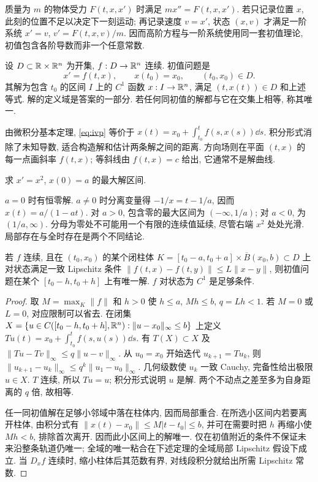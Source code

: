 质量为 $m$ 的物体受力 $F(t,x,x')$ 时满足 $mx''=F(t,x,x')$. 若只记录位置 $x$, 此刻的位置不足以决定下一刻运动; 再记录速度 $v=x'$, 状态 $(x,v)$ 才满足一阶系统 $x'=v$, $v'=F(t,x,v)/m$. 因而高阶方程与一阶系统使用同一套初值理论, 初值包含各阶导数而非一个任意常数.
\begin{definition}
设 $D\subset\mathbb R\times\mathbb R^n$ 为开集, $f:D\to\mathbb R^n$ 连续. 初值问题是
\begin{equation}\label{eq:ivp}
x'=f(t,x),\qquad x(t_0)=x_0,\qquad (t_0,x_0)\in D.
\end{equation}
其解为包含 $t_0$ 的区间 $I$ 上的 $C^1$ 函数 $x:I\to\mathbb R^n$, 满足 $(t,x(t))\in D$ 和上述等式. 解的定义域是答案的一部分. 若任何同初值的解都与它在交集上相等, 称其唯一.
\end{definition}
由微积分基本定理, \eqref{eq:ivp} 等价于 $x(t)=x_0+\int_{t_0}^t f(s,x(s))\dd s$. 积分形式消除了未知导数, 适合构造解和估计两条解之间的距离. 方向场则在平面 $(t,x)$ 的每一点画斜率 $f(t,x)$; 等斜线由 $f(t,x)=c$ 给出, 它通常不是解曲线.
\begin{example}
求 $x'=x^2$, $x(0)=a$ 的最大解区间.
\end{example}
\begin{solution}
$a=0$ 时有恒零解. $a\ne0$ 时分离变量得 $-1/x=t-1/a$, 因而 $x(t)=a/(1-at)$. 对 $a>0$, 包含零的最大区间为 $(-\infty,1/a)$; 对 $a<0$, 为 $(1/a,\infty)$. 分母为零处不可能用一个有限的连续值延续, 尽管右端 $x^2$ 处处光滑. 局部存在与全时存在是两个不同结论.
\end{solution}
\begin{theorem}[局部存在唯一性]\label{thm:picard}
若 $f$ 连续, 且在 $(t_0,x_0)$ 的某个闭柱体 $K=[t_0-a,t_0+a]\times\overline B(x_0,b)\subset D$ 上对状态满足一致 Lipschitz 条件 $\|f(t,x)-f(t,y)\|\le L\|x-y\|$, 则初值问题在某个 $[t_0-h,t_0+h]$ 上有唯一解. $f$ 对状态为 $C^1$ 是足够条件.
\end{theorem}
\begin{proof}
取 $M=\max_K\|f\|$ 和 $h>0$ 使 $h\le a$, $Mh\le b$, $q=Lh<1$. 若 $M=0$ 或 $L=0$, 对应限制可以省去. 在闭集 $X=\{u\in C([t_0-h,t_0+h],\mathbb R^n):\|u-x_0\|_\infty\le b\}$ 上定义
$Tu(t)=x_0+\int_{t_0}^t f(s,u(s))\dd s$. 有 $T(X)\subset X$ 及 $\|Tu-Tv\|_\infty\le q\|u-v\|_\infty$. 从 $u_0=x_0$ 开始迭代 $u_{k+1}=Tu_k$, 则
$\|u_{k+1}-u_k\|_\infty\le q^k\|u_1-u_0\|_\infty$. 几何级数使 $u_k$ 一致 Cauchy, 完备性给出极限 $u\in X$. $T$ 连续, 所以 $Tu=u$; 积分形式说明 $u$ 是解. 两个不动点之差至多为自身距离的 $q$ 倍, 故相等.

任一同初值解在足够小邻域中落在柱体内, 因而局部重合. 在所选小区间内若要离开柱体, 由积分式有 $\|x(t)-x_0\|\le M|t-t_0|\le b$, 并可在需要时把 $h$ 再缩小使 $Mh<b$, 排除首次离开. 因而此小区间上的解唯一. 仅在初值附近的条件不保证未来沿整条轨道仍唯一; 全域的唯一粘合在下述定理的全域局部 Lipschitz 假设下成立. 当 $D_xf$ 连续时, 缩小柱体后其范数有界, 对线段积分就给出所需 Lipschitz 常数.
\end{proof}
